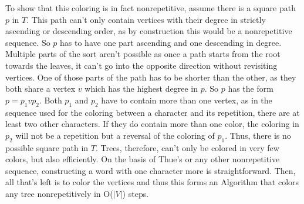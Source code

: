 \documentclass[12pt,a4paper]{article}
\begin{document}
\newline
To show that this coloring is in fact nonrepetitive, assume there is a square path $p$ in $T$. This path can't only contain vertices with their degree in strictly ascending or descending order, as by construction this would be a nonrepetitive sequence. So $p$ has to have one part ascending and one descending in degree. Multiple parts of the sort aren't possible as once a path starts from the root towards the leaves, it can't go into the opposite direction without revisiting vertices. One of those parts of the path has to be shorter than the other, as they both share a vertex $v$ which has the highest degree in $p$. So $p$ has the form $p = p_1vp_2$. Both $p_1$ and $p_2$ have to contain more than one vertex, as in the sequence used for the coloring between a character and its repetition, there are at least two other characters. If they do contain more than one color, the coloring in $p_2$ will not be a repetition but a reversal of the coloring of $p_1$. Thus, there is no possible square path in $T$. 
\newline
\newline
Trees, therefore, can't only be colored in very few colors, but also efficiently. On the basis of Thue's or any other nonrepetitive sequence, constructing a word with one character more is straightforward. Then, all that's left is to color the vertices and thus this forms an Algorithm that colors any tree nonrepetitively in O($|V|$) steps.


\newpage
\end{document}
